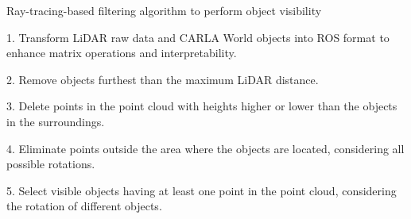 \begin{comment}
	\BlankLine
	
	\textbf{Function} $f_{\text{visible_{bb}}}(\text{bb}, \text{points})$:\;
	\Indp
	\textbf{return} $\text{np.logical_{and}} \\
	
	(\left( \text{np.logical_{and}} \left( \text{bb}[0] - \frac{\text{bb}[3]}{2} \leq \text{np.array(points[:, 0])}, \\
	\text{np.array(points[:, 0])} \leq \text{bb}[0] + \frac{\text{bb}[3]}{2} \right), \\
	\text{bb}[1] - \frac{\text{bb}[4]}{2} \leq \text{np.array(points[:, 1])} \right), \\
	\left( \text{np.logical_{and}} \left(\text{np.array(points[:, 1])} \leq \text{bb}[1] + \frac{\text{bb}[4]}{2} \right), \\
	\text{bb}[2] - \frac{\text{bb}[5]}{2} \leq \text{np.array(points[:, 2])}, \\
	\text{bb}[2] \leq \frac{\text{bb}[5]}{2})) $\;
	\Indm
	
	\BlankLine
	
	5. Select visible objects having at least one point in the point cloud, considering the rotation of different objects;
	
	\BlankLine
	
	$n_{\text{points\_in\_bb}} = 0$\;
	
	\If{\text{pointcloud is not None}}{
		$points\_in\_bb = f_{\text{visible\_bb}} \left( (\text{obj.position\_x}, \text{obj.position\_y}, \\ \text{obj.position\_z}, \text{obj.l}, \text{obj.w}, \text{obj.h}), \\
		\text{self.pointcloud} \right)$\;
		$n_{\text{points\_in\_bb}} = \text{np.add.reduce}(points\_in\_bb)$\;
	}
\end{comment}

\begin{algorithm}[h]
	\SetAlgoLined
	
	\caption{Ray-tracing-based filtering algorithm to perform object visibility}
	\label{alg:8_ray_tracing_object_visibility}
	
	\BlankLine
	
	1. Transform \ac{LiDAR} raw data and CARLA World objects into \ac{ROS} format to enhance matrix operations and interpretability.
	
	2. Remove objects furthest than the maximum \ac{LiDAR} distance.
	
	3. Delete points in the point cloud with heights higher or lower than the objects in the surroundings.
	
	4. Eliminate points outside the area where the objects are located, considering all possible rotations.

	5. Select visible objects having at least one point in the point cloud, considering the rotation of different objects.

\end{algorithm}

